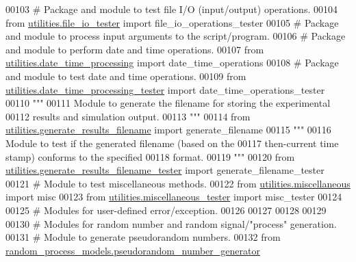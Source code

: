 \begin{DoxyCode}
00103 \textcolor{comment}{# Package and module to test file I/O (input/output) operations.}
00104 \textcolor{keyword}{from} \hyperlink{namespaceutilities_1_1file__io__tester}{utilities.file\_io\_tester} \textcolor{keyword}{import} file\_io\_operations\_tester
00105 \textcolor{comment}{# Package and module to process input arguments to the script/program.}
00106 \textcolor{comment}{# Package and module to perform date and time operations.}
00107 \textcolor{keyword}{from} \hyperlink{namespaceutilities_1_1date__time__processing}{utilities.date\_time\_processing} \textcolor{keyword}{import} date\_time\_operations
00108 \textcolor{comment}{# Package and module to test date and time operations.}
00109 \textcolor{keyword}{from} \hyperlink{namespaceutilities_1_1date__time__processing__tester}{utilities.date\_time\_processing\_tester} \textcolor{keyword}{import} 
      date\_time\_operations\_tester
00110 \textcolor{stringliteral}{"""}
00111 \textcolor{stringliteral}{    Module to generate the filename for storing the experimental}
00112 \textcolor{stringliteral}{        results and simulation output.}
00113 \textcolor{stringliteral}{"""}
00114 \textcolor{keyword}{from} \hyperlink{namespaceutilities_1_1generate__results__filename}{utilities.generate\_results\_filename} \textcolor{keyword}{import} generate\_filename
00115 \textcolor{stringliteral}{"""}
00116 \textcolor{stringliteral}{    Module to test if the generated filename (based on the}
00117 \textcolor{stringliteral}{        then-current time stamp) conforms to the specified}
00118 \textcolor{stringliteral}{        format.}
00119 \textcolor{stringliteral}{"""}
00120 \textcolor{keyword}{from} \hyperlink{namespaceutilities_1_1generate__results__filename__tester}{utilities.generate\_results\_filename\_tester} \textcolor{keyword}{import} 
      generate\_filename\_tester
00121 \textcolor{comment}{# Module to test miscellaneous methods.}
00122 \textcolor{keyword}{from} \hyperlink{namespaceutilities_1_1miscellaneous}{utilities.miscellaneous} \textcolor{keyword}{import} misc
00123 \textcolor{keyword}{from} \hyperlink{namespaceutilities_1_1miscellaneous__tester}{utilities.miscellaneous\_tester} \textcolor{keyword}{import} misc\_tester
00124 
00125 \textcolor{comment}{# Modules for user-defined error/exception.}
00126 
00127 
00128 
00129 
00130 \textcolor{comment}{# Modules for random number and random signal/"process" generation.}
00131 \textcolor{comment}{# Module to generate pseudorandom numbers.}
00132 \textcolor{keyword}{from} \hyperlink{namespacerandom__process__models_1_1pseudorandom__number__generator}{random\_process\_models.pseudorandom\_number\_generator}

\end{DoxyCode}
